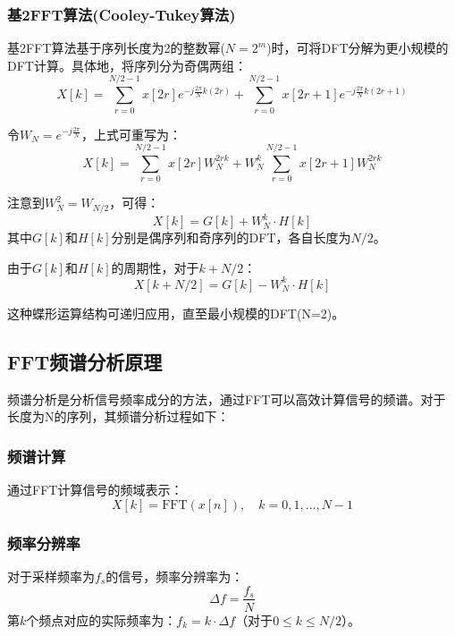 \documentclass[12pt,hyperref,a4paper,UTF8]{ctexart}
\begin{document}
\subsubsection{基2FFT算法(Cooley-Tukey算法)}
基2FFT算法基于序列长度为2的整数幂($N=2^m$)时，可将DFT分解为更小规模的DFT计算。具体地，将序列分为奇偶两组：
\begin{equation}
X[k] = \sum_{r=0}^{N/2-1} x[2r]e^{-j\frac{2\pi}{N}k(2r)} + \sum_{r=0}^{N/2-1} x[2r+1]e^{-j\frac{2\pi}{N}k(2r+1)}
\end{equation}

令$W_N = e^{-j\frac{2\pi}{N}}$，上式可重写为：
\begin{equation}
X[k] = \sum_{r=0}^{N/2-1} x[2r]W_N^{2rk} + W_N^k\sum_{r=0}^{N/2-1} x[2r+1]W_N^{2rk}
\end{equation}

注意到$W_N^2 = W_{N/2}$，可得：
\begin{equation}
X[k] = G[k] + W_N^k \cdot H[k]
\end{equation}
其中$G[k]$和$H[k]$分别是偶序列和奇序列的DFT，各自长度为$N/2$。

由于$G[k]$和$H[k]$的周期性，对于$k+N/2$：
\begin{equation}
X[k+N/2] = G[k] - W_N^k \cdot H[k]
\end{equation}

这种蝶形运算结构可递归应用，直至最小规模的DFT(N=2)。

\subsection{FFT频谱分析原理}

频谱分析是分析信号频率成分的方法，通过FFT可以高效计算信号的频谱。对于长度为N的序列，其频谱分析过程如下：

\subsubsection{频谱计算}
通过FFT计算信号的频域表示：
\begin{equation}
X[k] = \text{FFT}(x[n]), \quad k = 0,1,\ldots,N-1
\end{equation}

\subsubsection{频率分辨率}
对于采样频率为$f_s$的信号，频率分辨率为：
\begin{equation}
\Delta f = \frac{f_s}{N}
\end{equation}
第$k$个频点对应的实际频率为：$f_k = k \cdot \Delta f$（对于$0 \leq k \leq N/2$）。
\end{document}
